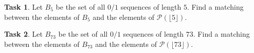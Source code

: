 \documentclass[12pt]{amsart}
\theoremstyle{definition}
\newtheorem{task}{Task}
\begin{document}
\begin{task}
Let $B_5$ be the set of all $0/1$ sequences of length $5$.
Find a matching between the elements of $B_5$ and the elements of $\mathcal{P}(\lfloor 5 \rfloor)$.
\end{task}

\begin{task}
Let $B_{73}$ be the set of all $0/1$ sequences of length $73$.
Find a matching between the elements of $B_{73}$ and the elements of $\mathcal{P}(\lfloor 73 \rfloor)$.
\end{task}
\end{document}
